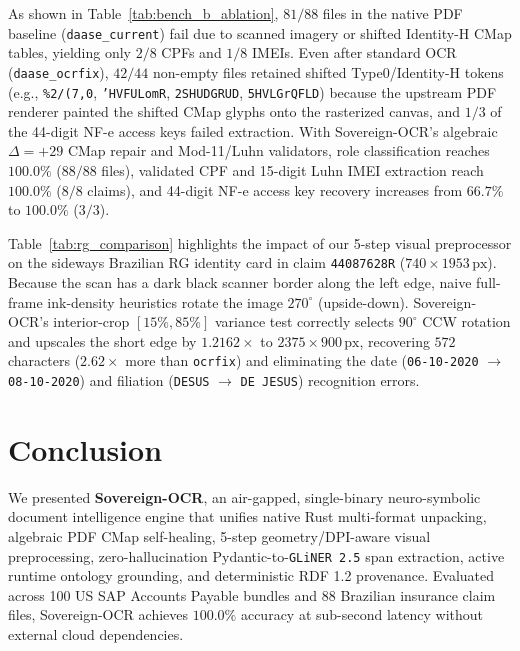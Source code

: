 \documentclass[10pt,twocolumn,letterpaper]{article}
\begin{document}
As shown in Table~\ref{tab:bench_b_ablation}, $81/88$ files in the native PDF baseline (\texttt{daase\_current}) fail due to scanned imagery or shifted Identity-H CMap tables, yielding only $2/8$ CPFs and $1/8$ IMEIs. Even after standard OCR (\texttt{daase\_ocrfix}), $42/44$ non-empty files retained shifted Type0/Identity-H tokens (e.g., \texttt{\%2/(7,0}, \texttt{'HVFULomR}, \texttt{2SHUDGRUD}, \texttt{5HVLGrQFLD}) because the upstream PDF renderer painted the shifted CMap glyphs onto the rasterized canvas, and $1/3$ of the 44-digit NF-e access keys failed extraction. With Sovereign-OCR's algebraic $\Delta=+29$ CMap repair and Mod-11/Luhn validators, role classification reaches $\mathbf{100.0\%}$ ($88/88$ files), validated CPF and 15-digit Luhn IMEI extraction reach $\mathbf{100.0\%}$ ($8/8$ claims), and 44-digit NF-e access key recovery increases from $66.7\%$ to $\mathbf{100.0\%}$ ($3/3$).

Table~\ref{tab:rg_comparison} highlights the impact of our 5-step visual preprocessor on the sideways Brazilian RG identity card in claim \texttt{44087628R} ($740\times 1953\,\text{px}$). Because the scan has a dark black scanner border along the left edge, naive full-frame ink-density heuristics rotate the image $270^\circ$ (upside-down). Sovereign-OCR's interior-crop $[15\%, 85\%]$ variance test correctly selects $90^\circ$ CCW rotation and upscales the short edge by $1.2162\times$ to $2375\times 900\,\text{px}$, recovering $572$ characters ($2.62\times$ more than \texttt{ocrfix}) and eliminating the date (\texttt{06-10-2020} $\to$ \texttt{08-10-2020}) and filiation (\texttt{DESUS} $\to$ \texttt{DE JESUS}) recognition errors.

\section{Conclusion}

We presented \textbf{Sovereign-OCR}, an air-gapped, single-binary neuro-symbolic document intelligence engine that unifies native Rust multi-format unpacking, algebraic PDF CMap self-healing, 5-step geometry/DPI-aware visual preprocessing, zero-hallucination Pydantic-to-\texttt{GLiNER 2.5} span extraction, active runtime ontology grounding, and deterministic RDF 1.2 provenance. Evaluated across 100 US SAP Accounts Payable bundles and 88 Brazilian insurance claim files, Sovereign-OCR achieves $100.0\%$ accuracy at sub-second latency without external cloud dependencies.
\end{document}
